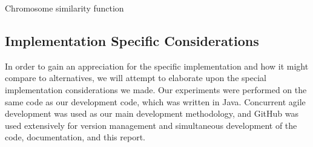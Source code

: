 \documentclass{sig-alternate}
\begin{document}
\begin{algorithm}
  \SetAlgoLined
  \DontPrintSemicolon
  
\caption{Chromosome similarity function}
\label{alg:similarity}
\end{algorithm}




\subsection{Implementation Specific Considerations}
In order to gain an appreciation for the specific implementation and how it might compare to alternatives, we will attempt to elaborate upon the special implementation considerations we made. Our experiments were performed on the same code as our development code, which was written in Java. Concurrent agile development was used as our main development methodology, and GitHub was used extensively for version management and simultaneous development of the code, documentation, and this report. 
\end{document}
